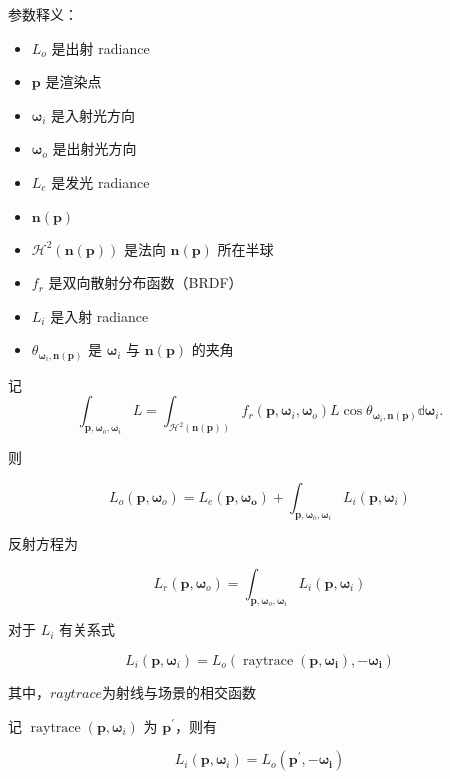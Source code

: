\documentclass[14pt]{scrartcl} %
\begin{document}
参数释义：
\begin{itemize}
	\item $L_o$ 是出射 radiance
	\item $\pmb{p}$ 是渲染点
	\item $\pmb{\omega}_i$ 是入射光方向
	\item $\pmb{\omega}_o$ 是出射光方向
	\item $L_e$ 是发光 radiance
	\item $\pmb{n}(\pmb{p})$ 
	\item ${\mathcal{H}^2(\pmb{n}(\pmb{p}))} $ 是法向 $\pmb{n}(\pmb{p})$ 所在半球
	\item $f_r$ 是双向散射分布函数（BRDF）
	\item $L_i$ 是入射 radiance
	\item $\theta_{\pmb{\omega}_i,\pmb{n}(\pmb{p})}$ 是 $\pmb{\omega}_i$ 与 $\pmb{n}(\pmb{p})$ 的夹角
\end{itemize}
记
\begin{equation}
\int_{\pmb{p},\pmb{\omega}_o,\pmb{\omega}_i}L=\int_{\mathcal{H}^2(\pmb{n}(\pmb{p}))} f_r(\pmb{p},\pmb{\omega}_i,\pmb{\omega}_o)L\cos\theta_{\pmb{\omega}_i,\pmb{n}(\pmb{p})}\mathbb{d}\pmb{\omega}_i.
\end{equation}

则

\begin{equation}
L_o(\pmb{p},\pmb{\omega}_o)=L_e(\pmb{p},\pmb{\pmb{\omega}_o})+\int_{\pmb{p},\pmb{\omega}_o,\pmb{\omega}_i}L_i(\pmb{p},\pmb{\omega}_i)
\end{equation}

反射方程为

\begin{equation}
L_r(\pmb{p},\pmb{\omega}_o)=\int_{\pmb{p},\pmb{\omega}_o,\pmb{\omega}_i}L_i(\pmb{p},\pmb{\omega}_i)
\end{equation}

对于 $L_i$ 有关系式

\begin{equation}
L_i(\pmb{p},\pmb{\omega}_i)=L_o(\mathop{raytrace}(\pmb{p},\pmb{\omega_i}),-\pmb{\omega_i})
\end{equation}

其中，$raytrace$为射线与场景的相交函数

\pagebreak

记 $\mathop{raytrace}(\pmb{p},\pmb{\omega}_i)$ 为 $\pmb{p}^\prime$，则有

\begin{equation}
L_i(\pmb{p},\pmb{\omega}_i)=L_o(\pmb{p}^\prime,-\pmb{\omega_i})
\end{equation}
\end{document}
